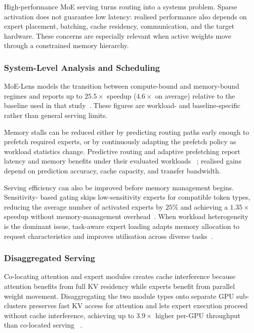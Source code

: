 \documentclass[10pt]{article}
\begin{document}
High-performance MoE serving turns routing into a systems problem.  Sparse activation
does not guarantee low latency: realised performance also depends on expert placement,
batching, cache residency, communication, and the target hardware.  These concerns are
especially relevant when active weights move through a constrained memory hierarchy.

\subsubsection{System-Level Analysis and Scheduling}

MoE-Lens models the transition between compute-bound and memory-bound regimes and
reports up to $25.5\!\times$ speedup ($4.6\!\times$ on average) relative to the
baseline used in that study~\citep{yuan2025moelenshardwarelimithighthroughput}.  These
figures are workload- and baseline-specific rather than general serving limits.

Memory stalls can be reduced either by predicting routing paths early enough to
prefetch required experts, or by continuously adapting the prefetch policy as workload
statistics change.  Predictive routing and adaptive prefetching report latency and
memory benefits under their evaluated workloads
~\citep{2024arXiv241017954H,shen2025expertflowadaptiveexpertscheduling}; realised gains
depend on prediction accuracy, cache capacity, and transfer bandwidth.

Serving efficiency can also be improved before memory management begins.  Sensitivity-
based gating skips low-sensitivity experts for compatible token types, reducing the
average number of activated experts by $25\%$ and achieving a $1.35\!\times$ speedup
without memory-management overhead~\citep{Zhong_2024}.  When workload heterogeneity is
the dominant issue, task-aware expert loading adapts memory allocation to request
characteristics and improves utilisation across diverse tasks~\citep{tairin2025emoetaskawarememoryefficient}.

\subsubsection{Disaggregated Serving}

Co-locating attention and expert modules creates cache interference because attention
benefits from full KV residency while experts benefit from parallel weight movement.
Disaggregating the two module types onto separate GPU sub-clusters preserves fast KV
access for attention and lets expert execution proceed without cache interference,
achieving up to $3.9\!\times$ higher per-GPU throughput than co-located serving
~\citep{zhang2026janusdisaggregatingattentionexperts}.
\end{document}
